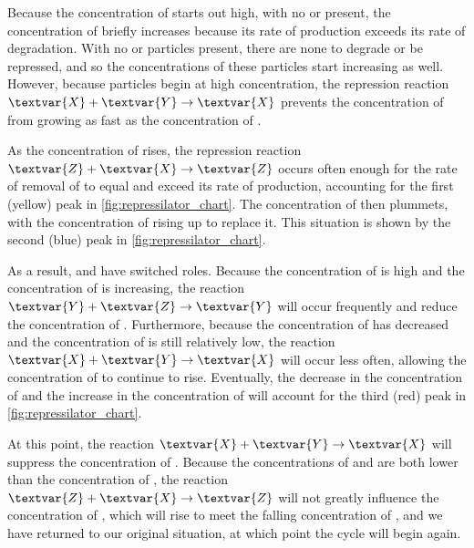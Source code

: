 Because the concentration of  starts out high, with no  or  present, the concentration of  briefly increases because its rate of production exceeds its rate of degradation. With no  or  particles present, there are none to degrade or be repressed, and so the concentrations of these particles start increasing as well. However, because  particles begin at high concentration, the repression reaction $\textvar{X} + \textvar{Y} \rightarrow \textvar{X}$ prevents the concentration of  from growing as fast as the concentration of .

As the concentration of  rises, the repression reaction $\textvar{Z} + \textvar{X} \rightarrow \textvar{Z}$ occurs often enough for the rate of removal of  to equal and exceed its rate of production, accounting for the first (yellow) peak in \autoref{fig:repressilator_chart}. The concentration of  then plummets, with the concentration of  rising up to replace it. This situation is shown by the second (blue) peak in \autoref{fig:repressilator_chart}.

As a result,  and  have switched roles. Because the concentration of  is high and the concentration of  is increasing, the reaction $\textvar{Y} + \textvar{Z} \rightarrow \textvar{Y}$ will occur frequently and reduce the concentration of . Furthermore, because the concentration of  has decreased and the concentration of  is still relatively low, the reaction $\textvar{X} + \textvar{Y} \rightarrow \textvar{X}$ will occur less often, allowing the concentration of  to continue to rise. Eventually, the decrease in the concentration of  and the increase in the concentration of  will account for the third (red) peak in \autoref{fig:repressilator_chart}.

At this point, the reaction $\textvar{X} + \textvar{Y} \rightarrow \textvar{X}$ will suppress the concentration of . Because the concentrations of  and  are both lower than the concentration of , the reaction $\textvar{Z} + \textvar{X} \rightarrow \textvar{Z}$ will not greatly influence the concentration of , which will rise to meet the falling concentration of , and we have returned to our original situation, at which point the cycle will begin again.

\FloatBarrier
{}
